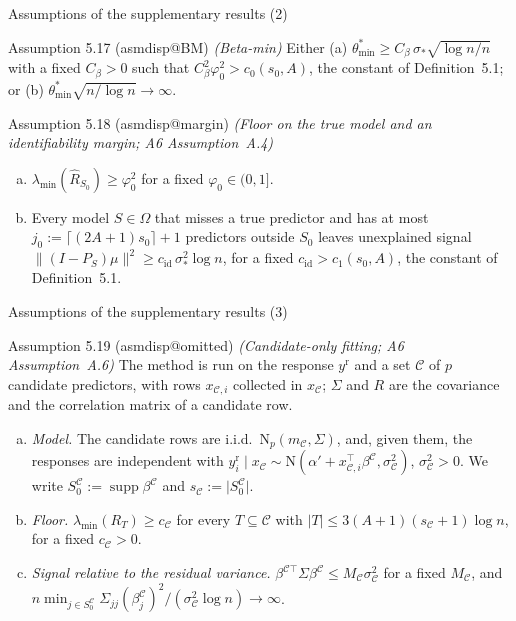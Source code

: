 \documentclass[aspectratio=169]{beamer}
\makeatletter
\newcommand{\asmdisp}[1]{\csname asmdisp@#1\endcsname}
\newcommand{\abs}[1]{\lvert #1\rvert}
\newcommand{\norm}[1]{\lVert #1\rVert}
\DeclareMathOperator{\supp}{supp}
\newcommand{\Normal}{\mathrm{N}}
\newcommand{\lmin}{\lambda_{\min}}
\newcommand{\yr}{y^{\mathrm r}}
\newcommand{\sigs}{\sigma_*}
\newcommand{\tmin}{\theta^*_{\min}}
\newcommand{\Sz}{S_0}
\newcommand{\sz}{s_0}
\newcommand{\Rhat}{\hat R}
\newcommand{\rn}{\sqrt{\log n/n}}
\newcommand{\Om}{\Omega}
\makeatother
\begin{document}
\begin{frame}{Assumptions of the supplementary results (2)}
\small
\begin{block}{Assumption 5.17 (\asmdisp{BM}) \textit{(Beta-min)}}
Either (a) $\tmin\ge C_\beta\,\sigs\rn$ with a fixed $C_\beta>0$ such that $C_\beta^2\varphi_0^2>c_0(\sz,A)$, the constant
of Definition~5.1; or (b) $\tmin\sqrt{n/\log n}\to\infty$.
\end{block}
\begin{block}{Assumption 5.18 (\asmdisp{margin}) \textit{(Floor on the true model and an identifiability margin; A6 Assumption~A.4)}}
\begin{enumerate}[(a)]
  \item $\lmin(\Rhat_{\Sz})\ge\varphi_0^2$ for a fixed $\varphi_0\in(0,1]$.
  \item Every model $S\in\Om$ that misses a true predictor and has at most $j_0:=\lceil(2A+1)\sz\rceil+1$ predictors
    outside $\Sz$ leaves unexplained signal $\norm{(I-P_S)\mu}^2\ge c_{\mathrm{id}}\,\sigs^2\log n$, for a fixed
    $c_{\mathrm{id}}>c_1(\sz,A)$, the constant of Definition~5.1.
\end{enumerate}
\end{block}
\end{frame}

\begin{frame}{Assumptions of the supplementary results (3)}
\small
\begin{block}{Assumption 5.19 (\asmdisp{omitted}) \textit{(Candidate-only fitting; A6 Assumption~A.6)}}
The method is run on the response $\yr$ and a set $\mathcal C$ of $p$ candidate predictors, with rows $x_{\mathcal C,i}$
collected in $x_{\mathcal C}$; $\Sigma$ and $R$ are the covariance and the correlation matrix of a candidate row.
\begin{enumerate}[(a)]
  \item \emph{Model.} The candidate rows are i.i.d.\ $\Normal_p(m_{\mathcal C},\Sigma)$, and, given them, the responses are
    independent with $\yr_i\mid x_{\mathcal C}\sim\Normal(\alpha'+x_{\mathcal C,i}^\top\beta^{\mathcal C},\sigma^2_{\mathcal C})$,
    $\sigma^2_{\mathcal C}>0$. We write $\Sz^{\mathcal C}:=\supp\beta^{\mathcal C}$ and $s_{\mathcal C}:=\abs{\Sz^{\mathcal C}}$.
  \item \emph{Floor.} $\lmin(R_T)\ge c_{\mathcal C}$ for every $T\subseteq\mathcal C$ with
    $\abs{T}\le3(A+1)(s_{\mathcal C}+1)\log n$, for a fixed $c_{\mathcal C}>0$.
  \item \emph{Signal relative to the residual variance.} $\beta^{\mathcal C\top}\Sigma\beta^{\mathcal C}\le
    M_{\mathcal C}\sigma^2_{\mathcal C}$ for a fixed $M_{\mathcal C}$, and $n\min_{j\in\Sz^{\mathcal C}}\Sigma_{jj}(\beta^{\mathcal
    C}_j)^2/(\sigma^2_{\mathcal C}\log n)\to\infty$.
\end{enumerate}
\end{block}
\end{frame}
\end{document}
